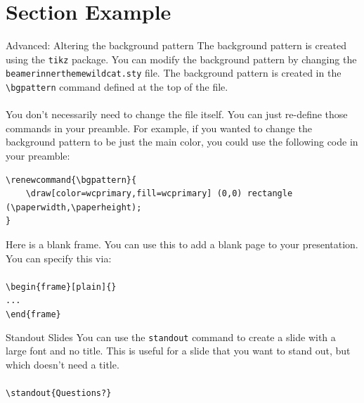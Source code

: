 \documentclass[aspectratio=1610]{beamer}
\begin{document}
\section{Section Example}

\begin{frame}[fragile]{Advanced: Altering the background pattern}
    The background pattern is created using the \texttt{tikz} package. You can modify the background pattern by changing the \texttt{beamerinnerthemewildcat.sty} file. The background pattern is created in the \texttt{\textbackslash bgpattern} command defined at the top of the file.
    \\ ~ \\
    You don't necessarily need to change the file itself. You can just re-define those commands in your preamble. For example, if you wanted to change the background pattern to be just the main color, you could use the following code in your preamble: \\
    
    \scriptsize
    \begin{verbatim}
\renewcommand{\bgpattern}{
    \draw[color=wcprimary,fill=wcprimary] (0,0) rectangle (\paperwidth,\paperheight);
}
    \end{verbatim} 
\end{frame}




\begin{frame}[plain]{}
    Here is a blank frame. You can use this to add a blank page to your presentation. You can specify this via:
    \\ ~ \\
    \texttt{\textbackslash begin\{frame\}[plain]\{\}} \\
    \texttt{...} \\
    \texttt{\textbackslash end\{frame\}}
\end{frame}

\begin{frame}{Standout Slides}
    You can use the \texttt{standout} command to create a slide with a large font and no title. This is useful for a slide that you want to stand out, but which doesn't need a title.
    \\ ~ \\
    \texttt{\textbackslash standout\{Questions?\}}

\end{frame}

\end{document}
